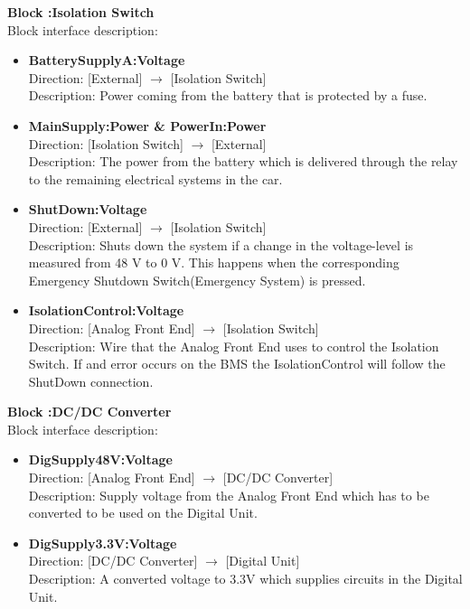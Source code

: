 \textbf{Block :Isolation Switch}\\
Block interface description:
\begin{itemize}
	\item \textbf{BatterySupplyA:Voltage}\\
	Direction: [External] $\rightarrow$ [Isolation Switch]\\
	Description: Power coming from the battery that is protected by a fuse.
	\item \textbf{MainSupply:Power \& PowerIn:Power}\\
	Direction: [Isolation Switch] $\rightarrow$ [External]\\
	Description: The power from the battery which is delivered through the relay to the remaining electrical systems in the car. 
	\item \textbf{ShutDown:Voltage}\\
	Direction: [External] $\rightarrow$ [Isolation Switch]\\
	Description: Shuts down the system if a change in the voltage-level is measured from 48 V to 0 V. This happens when the corresponding Emergency Shutdown Switch(Emergency System) is pressed.
	\item \textbf{IsolationControl:Voltage}\\
	Direction: [Analog Front End] $\rightarrow$ [Isolation Switch]\\
	Description: Wire that the Analog Front End uses to control the Isolation Switch. If and error occurs on the BMS the IsolationControl will follow the ShutDown connection.  
\end{itemize}

\textbf{Block :DC/DC Converter}\\
Block interface description:
\begin{itemize}
	\item \textbf{DigSupply48V:Voltage}\\
	Direction: [Analog Front End] $\rightarrow$ [DC/DC Converter]\\
	Description: Supply voltage from the Analog Front End which has to be converted to be used on the Digital Unit.
	\item \textbf{DigSupply3.3V:Voltage}\\
	Direction: [DC/DC Converter] $\rightarrow$ [Digital Unit]\\
	Description: A converted voltage to 3.3V which supplies circuits in the Digital Unit. 
\end{itemize}


